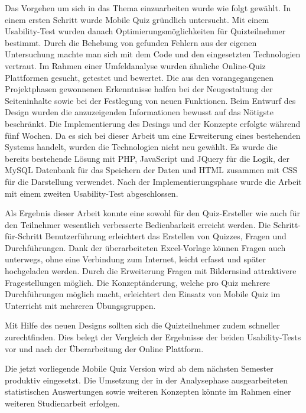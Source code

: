 Das Vorgehen um sich in das Thema einzuarbeiten wurde wie folgt gewählt. In einem ersten Schritt wurde Mobile Quiz gründlich untersucht. Mit einem \gls{Usability-Test} wurden danach Optimierungsmöglichkeiten für Quizteilnehmer bestimmt. Durch die Behebung von gefunden Fehlern aus der eigenen Untersuchung machte man sich mit dem Code und den eingesetzten Technologien vertraut. Im Rahmen einer Umfeldanalyse wurden ähnliche Online-Quiz Plattformen gesucht, getestet und bewertet. Die aus den vorangegangenen Projektphasen gewonnenen Erkenntnisse halfen bei der Neugestaltung der Seiteninhalte sowie bei der Festlegung von neuen Funktionen. Beim Entwurf des Design wurden die anzuzeigenden Informationen bewusst auf das Nötigste beschränkt. Die Implementierung des Desings und der Konzepte erfolgte während fünf Wochen. Da es sich bei dieser Arbeit um eine Erweiterung eines bestehenden Systems handelt, wurden die Technologien nicht neu gewählt. Es wurde die bereits bestehende Lösung mit PHP, JavaScript und JQuery für die Logik, der MySQL Datenbank für das Speichern der Daten und HTML zusammen mit CSS für die Darstellung verwendet. Nach der Implementierungsphase wurde die Arbeit mit einem zweiten Usability-Test abgeschlossen.

\bigskip

Als Ergebnis dieser Arbeit konnte eine sowohl für den Quiz-Ersteller wie auch für den Teilnehmer wesentlich verbesserte Bedienbarkeit erreicht werden. Die Schritt-für-Schritt Benutzerführung erleichtert das Erstellen von Quizzes, Fragen und Durchführungen. Dank der überarbeiteten Excel-Vorlage können Fragen auch unterwegs, ohne eine Verbindung zum Internet, leicht erfasst und später hochgeladen werden. Durch die Erweiterung \glqq Fragen mit Bildern\grqq sind attraktivere Fragestellungen möglich. Die Konzeptänderung, welche pro Quiz mehrere Durchführungen möglich macht, erleichtert den Einsatz von Mobile Quiz im Unterricht mit mehreren Übungsgruppen. 

Mit Hilfe des neuen Designs sollten sich die Quizteilnehmer zudem schneller zurechtfinden. Dies belegt der Vergleich der Ergebnisse der beiden Usability-Tests vor und nach der Überarbeitung der Online Plattform. 

\bigskip

Die jetzt vorliegende Mobile Quiz Version wird ab dem nächsten Semester produktiv eingesetzt. Die Umsetzung der in der Analysephase ausgearbeiteten statistischen Auswertungen sowie weiteren Konzepten könnte im Rahmen einer weiteren Studienarbeit erfolgen.